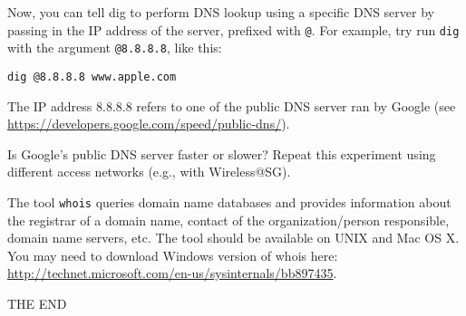 \documentclass[a4paper,11pt]{exam}
\begin{document}
\begin{questions}
\begin{parts}
Now, you can tell dig to perform DNS lookup using a specific DNS server by passing in the IP address of the server, prefixed with \texttt{@}.  For example, try run \texttt{dig} with the argument \texttt{@8.8.8.8}, like this:

\texttt{dig @8.8.8.8 www.apple.com}

The IP address 8.8.8.8 refers to one of the public DNS server ran by Google (see \url{https://developers.google.com/speed/public-dns/}).

Is Google's public DNS server faster or slower?  Repeat this experiment using different access networks (e.g., with Wireless@SG).

\end{parts}


The tool \texttt{whois} queries domain name databases and provides information about the registrar of a domain name, contact of the organization/person responsible, domain name servers, etc.  The tool should be available on UNIX and Mac OS X.  You may need to download Windows version of whois here: \url{http://technet.microsoft.com/en-us/sysinternals/bb897435}.


\end{questions}

\vfill
\begin{center}
    \textsf{\Huge THE END}
\end{center}
\end{document}
